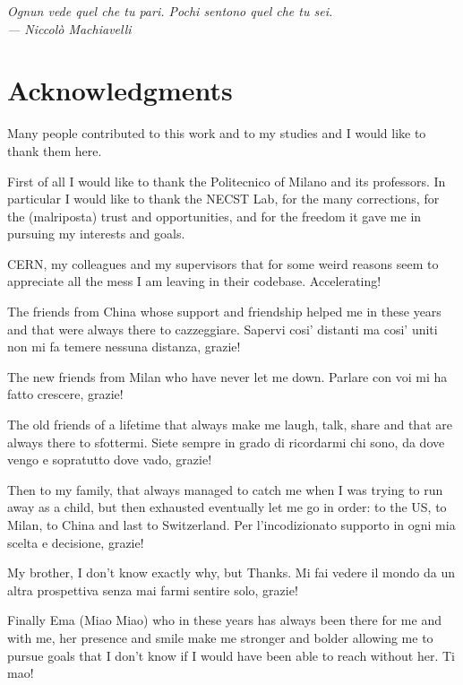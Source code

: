 
\begin{flushright}{\slshape
    Ognun vede quel che tu pari. Pochi sentono quel che tu sei.
        \\
        --- Niccolò Machiavelli}
\end{flushright}



\bigskip

\begingroup
\let\clearpage\relax
\let\cleardoublepage\relax
\let\cleardoublepage\relax
\chapter*{Acknowledgments}

Many people contributed to this work and to my studies and I would like to
thank them here.

\bigskip

First of all I would like to thank the Politecnico of Milano and its
professors. In particular I would like to thank the NECST Lab, for the many
corrections, for the (malriposta) trust and opportunities, and for the freedom
it gave me in pursuing my interests and goals.


\bigskip

CERN, my colleagues and my supervisors that for some weird reasons seem to
appreciate all the mess I am leaving in their codebase. Accelerating!

\bigskip

The friends from China whose support and friendship helped me in these years
and that were always there to cazzeggiare. Sapervi cosi’ distanti ma cosi’
uniti non mi fa temere nessuna distanza, grazie!

\bigskip

The new friends from Milan who have never let me down. Parlare con
voi mi ha fatto crescere, grazie!

\bigskip

The old friends of a lifetime that always make me laugh, talk, share and that
are always there to sfottermi. Siete sempre in grado di ricordarmi chi sono, da
dove vengo e sopratutto dove vado, grazie!

\bigskip

Then to my family, that always managed to catch me when I was trying
to run away as a child, but then exhausted eventually let me go in order: 
to the US, to Milan, to China and last to Switzerland. Per
l’incodizionato supporto in ogni mia scelta e decisione, grazie!

\bigskip

My brother, I don't know exactly why, but Thanks. Mi fai vedere il mondo da un
altra prospettiva senza mai farmi sentire solo, grazie!

\bigskip

Finally Ema (Miao Miao) who in these years has always been there for me and with me,
her presence and smile make me stronger and bolder allowing me to pursue
goals that I don’t know if I would have been able to reach without her. Ti mao!


\endgroup
